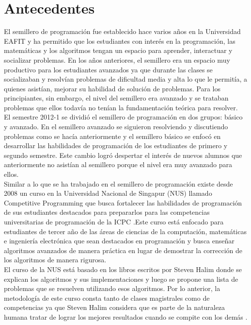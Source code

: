 \documentclass[11pt, oneside]{article}
\theoremstyle{definition}
\theoremstyle{remark}
\begin{document}
\section{Antecedentes}
El semillero de programación fue establecido hace varios años en la Universidad EAFIT y ha permitido que los estudiantes con interés en la programación, las matemáticas y los algoritmos tengan un espacio para aprender, interactuar y socializar problemas. En los años anteriores, el semillero era un espacio muy productivo para los estudiantes avanzados ya que durante las clases se socializaban y resolvían problemas de dificultad media y alta lo que le permitía, a quienes asistían, mejorar su habilidad de solución de problemas. Para los principiantes, sin embargo, el nivel del semillero era avanzado y se trataban problemas que ellos todavía no tenían la fundamentación teórica para resolver.\\
El semestre 2012-1 se dividió el semillero de programación en dos grupos: básico y avanzado. En el semillero avanzado se siguieron resolviendo y discutiendo problemas como se hacía anteriormente y el semillero básico se enfocó en desarrollar las habilidades de programación de los estudiantes de primero y segundo semestre. Este cambio logró despertar el interés de nuevos alumnos que anteriormente no asistían al semillero porque el nivel era muy avanzado para ellos.\\
Similar a lo que se ha trabajado en el semillero de programación existe desde 2008 un curso en la Universidad Nacional de Singapur (NUS) llamado Competitive Programming que busca fortalecer las habilidades de programación de sus estudiantes destacados para prepararlos para las competencias universitarias de programación de la ICPC \cite{PaperHalim}.Este curso está enfocado para estudiantes de tercer año de las áreas de ciencias de la computación, matemáticas e ingeniería electrónica que sean destacados en programación y busca enseñar algoritmos avanzados de manera práctica en lugar de demostrar la corrección de los algoritmos de manera rigurosa.\\
El curso de la NUS está basado en los libros \cite{Halim, Halim2} escritos por Steven Halim donde se explican los algoritmos y sus implementaciones y luego se propone una lista de problemas que se resuelven utilizando esos algoritmos. Por lo anterior, la metodología de este curso consta tanto de clases magistrales como de competencias ya que Steven Halim considera que es parte de la naturaleza humana tratar de lograr los mejores resultados cuando se compite con los demás \cite{PaperHalim}. 
\end{document}
